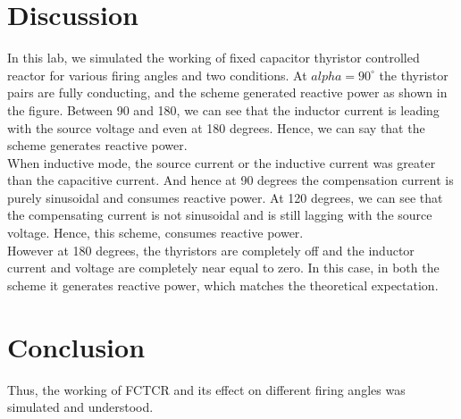 \documentclass[a4paper,12pt]{report}
\begin{document}
\section{Discussion}
In this lab, we simulated the working of fixed capacitor thyristor controlled reactor for various firing angles and two conditions. At $alpha=90^\circ$ the thyristor pairs are fully conducting, and the scheme generated reactive power as shown in the figure. Between 90 and 180, we can see that the inductor current is leading with the source voltage and even at 180 degrees. Hence, we can say that the scheme generates reactive power.\\[0.2cm]
When inductive mode, the source current or the inductive current was greater than the capacitive current. And hence at 90 degrees the compensation current is purely sinusoidal and consumes reactive power. At 120 degrees, we can see that the compensating current is not sinusoidal and is still lagging with the source voltage. Hence, this scheme, consumes reactive power.\\[0.2cm]
However at 180 degrees, the thyristors are completely off and the inductor current and voltage are completely near equal to zero. In this case, in both the scheme it generates reactive power, which matches the theoretical expectation.
\section{Conclusion}
Thus, the working of FCTCR and its effect on different firing angles was simulated and understood.
\end{document}
